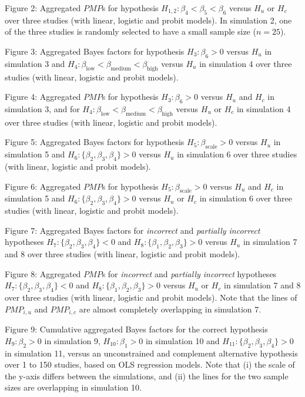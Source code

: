 \documentclass[
]{interact}
\begin{document}
Figure 2: Aggregated \(PMP\)s for hypothesis
\(H_{1,2}: \beta_4 < \beta_5 < \beta_6\) versus \(H_u\) or \(H_c\) over
three studies (with linear, logistic and probit models). In simulation
2, one of the three studies is randomly selected to have a small sample
size (\(n = 25\)).

Figure 3: Aggregated Bayes factors for hypothesis \(H_3: \beta_6 > 0\)
versus \(H_u\) in simulation 3 and
\(H_4: \beta_{\text{low}} < \beta_{\text{medium}} < \beta_{\text{high}}\)
versus \(H_u\) in simulation 4 over three studies (with linear, logistic
and probit models).

Figure 4: Aggregated \(PMP\)s for hypothesis \(H_3: \beta_6 > 0\) versus
\(H_u\) and \(H_c\) in simulation 3, and for
\(H_4: \beta_{\text{low}} < \beta_{\text{medium}} < \beta_{\text{high}}\)
versus \(H_u\) or \(H_c\) in simulation 4 over three studies (with
linear, logistic and probit models).

Figure 5: Aggregated Bayes factors for hypothesis
\(H_5: \beta_{\text{scale}} > 0\) versus \(H_u\) in simulation 5 and
\(H_6: \{\beta_2, \beta_3, \beta_4\} > 0\) versus \(H_u\) in simulation
6 over three studies (with linear, logistic and probit models).

Figure 6: Aggregated \(PMP\)s for hypothesis
\(H_5: \beta_{\text{scale}} > 0\) versus \(H_u\) and \(H_c\) in
simulation 5 and \(H_6: \{\beta_2, \beta_3, \beta_4\} > 0\) versus
\(H_u\) or \(H_c\) in simulation 6 over three studies (with linear,
logistic and probit models).

Figure 7: Aggregated Bayes factors for \textit{incorrect} and
\textit{partially incorrect} hypotheses
\(H_7: \{\beta_2, \beta_3, \beta_4\} < 0\) and
\(H_8: \{\beta_1, \beta_2, \beta_3\} > 0\) versus \(H_u\) in simulation
7 and 8 over three studies (with linear, logistic and probit models).

Figure 8: Aggregated \(PMP\)s for \textit{incorrect} and
\textit{partially incorrect} hypotheses
\(H_7: \{\beta_2, \beta_3, \beta_4\} < 0\) and
\(H_8: \{\beta_1, \beta_2, \beta_3\} > 0\) versus \(H_u\) or \(H_c\) in
simulation 7 and 8 over three studies (with linear, logistic and probit
models). Note that the lines of \(PMP_{i,u}\) and \(PMP_{i,c}\) are
almost completely overlapping in simulation 7.

Figure 9: Cumulative aggregated Bayes factors for the correct hypothesis
\(H_9: \beta_2 > 0\) in simulation 9, \(H_{10}: \beta_1 > 0\) in
simulation 10 and \(H_{11}: \{\beta_2, \beta_3, \beta_4\} > 0\) in
simulation 11, versus an unconstrained and complement alternative
hypothesis over 1 to 150 studies, based on OLS regression models. Note
that (i) the scale of the y-axis differs between the simulations, and
(ii) the lines for the two sample sizes are overlapping in simulation
10.
\end{document}
